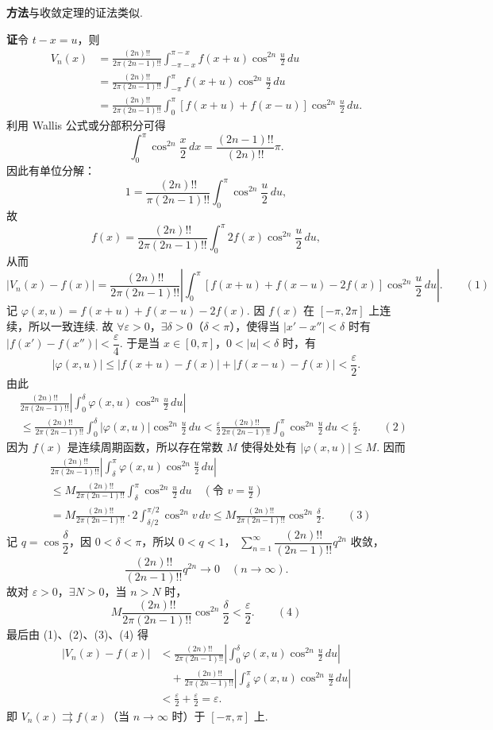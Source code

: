 \documentclass[UTF8, 12pt, fontset=fandol, oneside]{ctexart}
\begin{document}
\noindent\textbf{方法}\quad 与收敛定理的证法类似.

\noindent\textbf{证}\quad 令 $t-x=u$，则
\[
\begin{aligned}
V_n(x)&=\frac{(2n)!!}{2\pi(2n-1)!!}
\int_{-\pi-x}^{\pi-x}f(x+u)\cos^{2n}\frac u2\,du\\
&=\frac{(2n)!!}{2\pi(2n-1)!!}
\int_{-\pi}^{\pi}f(x+u)\cos^{2n}\frac u2\,du\\
&=\frac{(2n)!!}{2\pi(2n-1)!!}
\int_0^{\pi}[f(x+u)+f(x-u)]\cos^{2n}\frac u2\,du.
\end{aligned}
\]
利用 Wallis 公式或分部积分可得
\[
  \int_0^{\pi}\cos^{2n}\frac x2\,dx=\frac{(2n-1)!!}{(2n)!!}\pi.
\]
因此有单位分解：
\[
  1=\frac{(2n)!!}{\pi(2n-1)!!}\int_0^{\pi}\cos^{2n}\frac u2\,du,
\]
故
\[
  f(x)=\frac{(2n)!!}{2\pi(2n-1)!!}
  \int_0^{\pi}2f(x)\cos^{2n}\frac u2\,du,
\]
从而
\[
  |V_n(x)-f(x)|
  =\frac{(2n)!!}{2\pi(2n-1)!!}
  \left|\int_0^{\pi}[f(x+u)+f(x-u)-2f(x)]\cos^{2n}\frac u2\,du\right|. \qquad(1)
\]
记 $\varphi(x,u)=f(x+u)+f(x-u)-2f(x)$. 因 $f(x)$ 在 $[-\pi,2\pi]$ 上连续，所以一致连续. 故
$\forall\varepsilon>0$，$\exists\delta>0$（$\delta<\pi$），使得当 $|x'-x''|<\delta$ 时有
$|f(x')-f(x'')|<\dfrac{\varepsilon}{4}$. 于是当 $x\in[0,\pi]$，$0<|u|<\delta$ 时，有
\[
  |\varphi(x,u)|\le |f(x+u)-f(x)|+|f(x-u)-f(x)|<\frac{\varepsilon}{2}.
\]
由此
\[
\begin{aligned}
&\frac{(2n)!!}{2\pi(2n-1)!!}
\left|\int_0^{\delta}\varphi(x,u)\cos^{2n}\frac u2\,du\right|\\
&\le\frac{(2n)!!}{2\pi(2n-1)!!}
\int_0^{\delta}|\varphi(x,u)|\cos^{2n}\frac u2\,du
<\frac{\varepsilon}{2}\frac{(2n)!!}{2\pi(2n-1)!!}
\int_0^{\pi}\cos^{2n}\frac u2\,du<\frac{\varepsilon}{2}. \qquad(2)
\end{aligned}
\]
因为 $f(x)$ 是连续周期函数，所以存在常数 $M$ 使得处处有 $|\varphi(x,u)|\le M$. 因而
\[
\begin{aligned}
&\frac{(2n)!!}{2\pi(2n-1)!!}
\left|\int_{\delta}^{\pi}\varphi(x,u)\cos^{2n}\frac u2\,du\right|\\
&\le M\frac{(2n)!!}{2\pi(2n-1)!!}
\int_{\delta}^{\pi}\cos^{2n}\frac u2\,du
\quad\left(\text{令 }v=\frac u2\right)\\
&=M\frac{(2n)!!}{2\pi(2n-1)!!}
\cdot2\int_{\delta/2}^{\pi/2}\cos^{2n}v\,dv
\le M\frac{(2n)!!}{2\pi(2n-1)!!}\cos^{2n}\frac{\delta}{2}. \qquad(3)
\end{aligned}
\]
记 $q=\cos\dfrac{\delta}{2}$，因 $0<\delta<\pi$，所以 $0<q<1$，
$\displaystyle\sum_{n=1}^{\infty}\dfrac{(2n)!!}{(2n-1)!!}q^{2n}$ 收敛，
\[
  \frac{(2n)!!}{(2n-1)!!}q^{2n}\to0\quad(n\to\infty).
\]
故对 $\varepsilon>0$，$\exists N>0$，当 $n>N$ 时，
\[
  M\frac{(2n)!!}{2\pi(2n-1)!!}\cos^{2n}\frac{\delta}{2}<\frac{\varepsilon}{2}. \qquad(4)
\]
最后由 (1)、(2)、(3)、(4) 得
\[
\begin{aligned}
|V_n(x)-f(x)|
&<\frac{(2n)!!}{2\pi(2n-1)!!}
\left|\int_0^{\delta}\varphi(x,u)\cos^{2n}\frac u2\,du\right|\\
&\quad+\frac{(2n)!!}{2\pi(2n-1)!!}
\left|\int_{\delta}^{\pi}\varphi(x,u)\cos^{2n}\frac u2\,du\right|\\
&<\frac{\varepsilon}{2}+\frac{\varepsilon}{2}=\varepsilon.
\end{aligned}
\]
即 $V_n(x)\rightrightarrows f(x)$（当 $n\to\infty$ 时）于 $[-\pi,\pi]$ 上.
\end{document}
